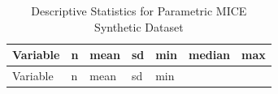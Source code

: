 \documentclass[
  letterpaper,
  DIV=11,
  numbers=noendperiod]{scrartcl}
\begin{document}
\begin{longtable}[]{@{}
  >{\raggedright\arraybackslash}p{}
  >{\raggedleft\arraybackslash}p{}
  >{\raggedleft\arraybackslash}p{}
  >{\raggedleft\arraybackslash}p{}
  >{\raggedleft\arraybackslash}p{}
  >{\raggedleft\arraybackslash}p{}
  >{\raggedleft\arraybackslash}p{}@{}}
\caption{Descriptive Statistics for Parametric MICE Synthetic
Dataset}\tabularnewline
\toprule\noalign{}
\begin{minipage}[b]{\linewidth}\raggedright
Variable
\end{minipage} & \begin{minipage}[b]{\linewidth}\raggedleft
n
\end{minipage} & \begin{minipage}[b]{\linewidth}\raggedleft
mean
\end{minipage} & \begin{minipage}[b]{\linewidth}\raggedleft
sd
\end{minipage} & \begin{minipage}[b]{\linewidth}\raggedleft
min
\end{minipage} & \begin{minipage}[b]{\linewidth}\raggedleft
median
\end{minipage} & \begin{minipage}[b]{\linewidth}\raggedleft
max
\end{minipage} \\
\midrule\noalign{}
\endfirsthead
\toprule\noalign{}
\begin{minipage}[b]{\linewidth}\raggedright
Variable
\end{minipage} & \begin{minipage}[b]{\linewidth}\raggedleft
n
\end{minipage} & \begin{minipage}[b]{\linewidth}\raggedleft
mean
\end{minipage} & \begin{minipage}[b]{\linewidth}\raggedleft
sd
\end{minipage} & \begin{minipage}[b]{\linewidth}\raggedleft
min
\end{minipage} & \begin{minipage}[b]{\linewidth}\raggedleft

\end{minipage}
\end{longtable}
\end{document}
